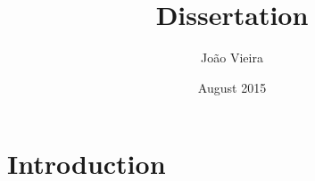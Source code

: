\documentclass{article}
\title{Dissertation}
\author{João Vieira}
\date{August 2015}
\begin{document}
\maketitle

\section{Introduction}
\end{document}
